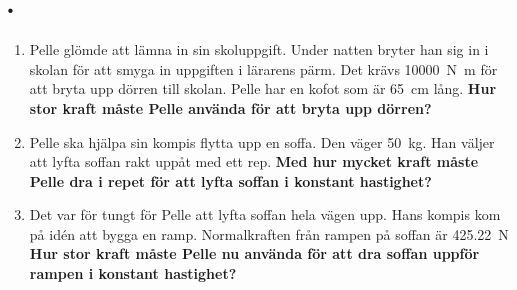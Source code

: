 \documentclass[11pt]{article}
\begin{document}
\raggedright

\section*{\lessonNumber. \lessonName}
\begin{enumerate}[itemsep=2em]
        \item
              \begin{minipage}[t]{0.5\textwidth}
                      Pelle glömde att lämna in sin skoluppgift.
                      Under natten bryter han sig in i skolan för att smyga in uppgiften i lärarens pärm. Det krävs \SI{10 000}{\newton\meter} för att bryta upp dörren till skolan. Pelle har en kofot som är \SI{65}{\centi\meter} lång. \textbf{Hur stor kraft måste Pelle använda för att bryta upp dörren?}
              \end{minipage}
              \hspace{1em}
              \begin{adjustbox}{valign=t}
                      
              \end{adjustbox}
        \item
              \begin{minipage}[t]{0.5\textwidth}
                      Pelle ska hjälpa sin kompis flytta upp en soffa. Den väger \SI{50}{\kilo\gram}. Han väljer att lyfta soffan rakt uppåt med ett rep. \textbf{Med hur mycket kraft måste Pelle dra i repet för att lyfta soffan i konstant hastighet?}
              \end{minipage}
              \hspace{1em}
              \begin{adjustbox}{valign=t}
                      
              \end{adjustbox}

        \item
              Det var för tungt för Pelle att lyfta soffan hela vägen upp. Hans kompis kom på idén att bygga en ramp. Normalkraften från rampen på soffan är \SI{425.22}{\newton} \textbf{Hur stor kraft måste Pelle nu använda för att dra soffan uppför rampen i konstant hastighet?}
              \vspace{0.5em}
              \begin{center}
                      
              \end{center}
              \newpage


\end{enumerate}
\end{document}
